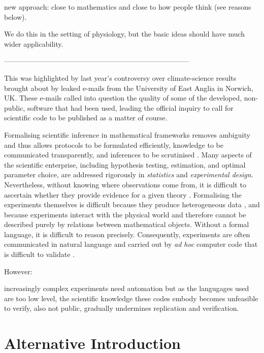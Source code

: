 new approach: close to mathematics and close to how people think
(see reasons below).


We do this in the setting of
physiology, but the basic ideas should have much wider applicability.




------------------------------------------------------------------------------


This was highlighted by last year's controversy
over climate-science results brought about by leaked e-mails from the
University of East Anglia in Norwich, UK. These e-mails called into question
the quality of some of the developed, non-public, software that had been used,
leading the official inquiry to call for scientific code to be published
as a matter of course.

Formalising scientific inference in mathematical frameworks removes
ambiguity and thus allows protocols to be formulated efficiently,
knowledge to be communicated transparently, and inferences to be
scrutinised \citep{Soldatova2006, Jaynes2003, Krantz1971}. Many
aspects of the scientific enterprise, including hypothesis testing,
estimation, and optimal parameter choice, are addressed rigorously in
\emph{statistics} and \emph{experimental design}. Nevertheless,
without knowing where observations come from, it is difficult to
ascertain whether they provide evidence for a given theory
\citep{Pool2002,MacKenzie-Graham2008,VanHorn2009}. Formalising the
experiments themselves is difficult because they produce heterogeneous
data \citep{Tukey1962}, and because experiments interact with the
physical world and therefore cannot be described purely by relations
between mathematical objects. Without a formal language, it is
difficult to reason precisely. Consequently, experiments are often
communicated in natural language and carried out by \emph{ad hoc}
computer code that is difficult to validate \citep{Baggerly2009, Merali2010}. 


However:

increasingly complex experiments need automation
but as the langugages used are too low level,
the scientific knowledge these codes embody becomes unfeasible
to verify, also not public, gradually undermines replication and
verification.


\section*{Alternative Introduction}

